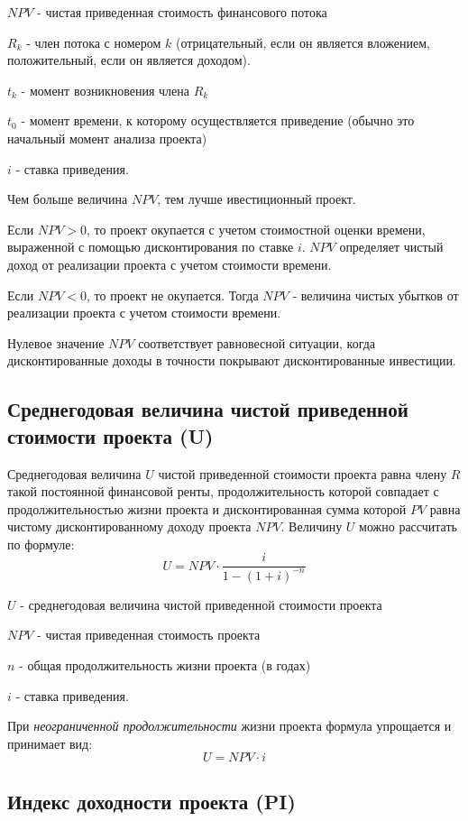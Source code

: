 \documentclass[aps,%
12pt,%
final,%
oneside,
onecolumn,%
musixtex, %
superscriptaddress,%
centertags]{article} %
\theoremstyle{plain}
\theoremstyle{definition}
\theoremstyle{remark}
\begin{document}
$NPV$ - чистая приведенная стоимость финансового потока

$R_k$ - член потока с номером $k$ (отрицательный, если он является вложением, положительный, если он является доходом).

$t_k$ - момент возникновения члена $R_k$

$t_0$ - момент времени, к которому осуществляется приведение (обычно это начальный момент анализа проекта)

$i$ - ставка приведения.

Чем больше величина $NPV$, тем лучше ивестиционный проект.

Если $NPV >0$, то проект окупается с учетом стоимостной оценки времени, выраженной с помощью дисконтирования по ставке $i$. $NPV$ определяет чистый доход от реализации проекта с учетом стоимости времени.

Если $NPV<0$, то проект не окупается. Тогда $NPV$ - величина чистых убытков от реализации проекта с учетом стоимости времени. 

Нулевое значение $NPV$ соответствует равновесной ситуации, когда дисконтированные доходы в точности покрывают дисконтированные инвестиции.


\subsection{Среднегодовая величина чистой приведенной стоимости проекта (U)}

Среднегодовая величина $U$ чистой приведенной стоимости проекта равна члену $R$ такой постоянной финансовой ренты, продолжительность которой совпадает с продолжительностью жизни проекта и дисконтированная сумма которой $PV$ равна чистому дисконтированному доходу проекта $NPV$. Величину $U$ можно рассчитать по формуле:
$$U = NPV \cdot \frac{i}{1-(1+i)^{-n}}$$

$U$ - среднегодовая величина чистой приведенной стоимости проекта

$NPV$ - чистая приведенная стоимость проекта

$n$ - общая продолжительность жизни проекта (в годах)

$i$ - ставка приведения.

При \textit{неограниченной продолжительности} жизни проекта формула упрощается и принимает вид:
$$U = NPV \cdot i$$

\subsection{Индекс доходности проекта (PI)}
\end{document}
